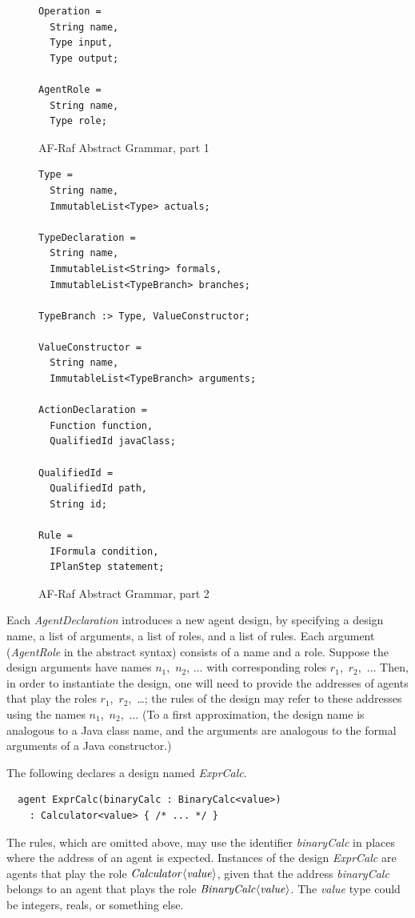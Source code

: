\documentclass[a4paper,12pt,oneside,fleqn]{book} %
\begin{document}
{\begin{figure}
\begin{verbatim}
Operation =
  String name,
  Type input,
  Type output;

AgentRole =
  String name,
  Type role;

\end{verbatim}
\caption{AF-Raf Abstract Grammar, part 1}
\label{fig:Abstract-Grammar1}
\end{figure}

\begin{figure}\footnotesize %
\begin{verbatim}
Type =
  String name,
  ImmutableList<Type> actuals;

TypeDeclaration =
  String name,
  ImmutableList<String> formals,
  ImmutableList<TypeBranch> branches;

TypeBranch :> Type, ValueConstructor;

ValueConstructor =
  String name,
  ImmutableList<TypeBranch> arguments;

ActionDeclaration =
  Function function,
  QualifiedId javaClass;

QualifiedId =
  QualifiedId path,
  String id;

Rule =
  IFormula condition,
  IPlanStep statement;
\end{verbatim}
\caption{AF-Raf Abstract Grammar, part 2}
\label{fig:Abstract-Grammar2}
\end{figure}

Each {\it AgentDeclaration\/} introduces a new agent design, by specifying
a design name, a list of arguments, a list of roles, and a list of rules.
Each argument ({\it AgentRole\/} in the abstract syntax) consists of a name
and a role. Suppose the design arguments have names $n_1$,~$n_2$, $\ldots$
with corresponding roles $r_1$,~$r_2$,~$\ldots$ Then, in order to
instantiate the design, one will need to provide the addresses of agents
that play the roles $r_1$,~$r_2$,~\dots; the rules of the design may refer
to these addresses using the names $n_1$,~$n_2$,~$\ldots$ (To a first
approximation, the design name is analogous to a Java class name, and the
arguments are analogous to the formal arguments of a Java constructor.)

\begin{example}
The following declares a design named {\it ExprCalc}.
\begin{verbatim}
  agent ExprCalc(binaryCalc : BinaryCalc<value>)
    : Calculator<value> { /* ... */ }
\end{verbatim}
The rules, which are omitted above, may use the identifier {\it
binaryCalc\/} in places where the address of an agent is expected.
Instances of the design {\it ExprCalc\/} are agents that play the role $\it
Calculator\langle value\rangle$, given that the address {\it binaryCalc\/}
belongs to an agent that plays the role $\it BinaryCalc\langle
value\rangle$. The {\it value\/} type could be integers, reals, or
something else.


\end{example}}
\end{document}
